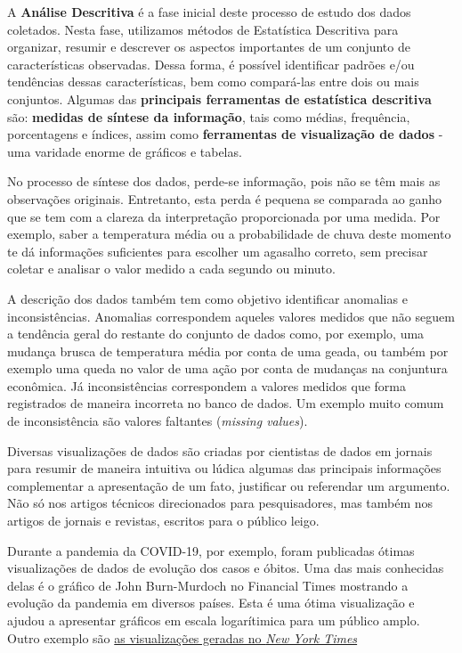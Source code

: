 \documentclass[
]{book}
\begin{document}
A \textbf{Análise Descritiva} é a fase inicial deste processo de estudo dos dados coletados. Nesta fase, utilizamos métodos de Estatística Descritiva para organizar, resumir e descrever os aspectos importantes de um conjunto de características observadas. Dessa forma, é possível identificar padrões e/ou tendências dessas características, bem como compará-las entre dois ou mais conjuntos. Algumas das \textbf{principais ferramentas de estatística descritiva} são: \textbf{medidas de síntese da informação}, tais como médias, frequência, porcentagens e índices, assim como \textbf{ferramentas de visualização de dados} - uma varidade enorme de gráficos e tabelas.

No processo de síntese dos dados, perde-se informação, pois não se têm mais as observações originais. Entretanto, esta perda é pequena se comparada ao ganho que se tem com a clareza da interpretação proporcionada por uma medida. Por exemplo, saber a temperatura média ou a probabilidade de chuva deste momento te dá informações suficientes para escolher um agasalho correto, sem precisar coletar e analisar o valor medido a cada segundo ou minuto.

A descrição dos dados também tem como objetivo identificar anomalias e inconsistências. Anomalias correspondem aqueles valores medidos que não seguem a tendência geral do restante do conjunto de dados como, por exemplo, uma mudança brusca de temperatura média por conta de uma geada, ou também por exemplo uma queda no valor de uma ação por conta de mudanças na conjuntura econômica. Já inconsistências correspondem a valores medidos que forma registrados de maneira incorreta no banco de dados. Um exemplo muito comum de inconsistência são valores faltantes (\emph{missing values}).

Diversas visualizações de dados são criadas por cientistas de dados em jornais para resumir de maneira intuitiva ou lúdica algumas das principais informações complementar a apresentação de um fato, justificar ou referendar um argumento. Não só nos artigos técnicos direcionados para pesquisadores, mas também nos artigos de jornais e revistas, escritos para o público leigo.

Durante a pandemia da COVID-19, por exemplo, foram publicadas ótimas visualizações de dados de evolução dos casos e óbitos. Uma das mais conhecidas delas é o gráfico de John Burn-Murdoch no Financial Times mostrando a evolução da pandemia em diversos países. Esta é uma ótima visualização e ajudou a apresentar gráficos em escala logarítimica para um público amplo. Outro exemplo são \href{https://www.nytimes.com/spotlight/graphics}{as visualizações geradas no \emph{New York Times}}
\end{document}
